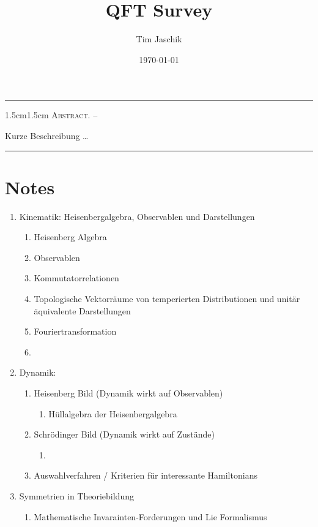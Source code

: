 \documentclass[10pt, letterpaper]{article}
\title{QFT Survey}
\author{Tim Jaschik}
\date{\today}
\renewenvironment{abstract}
  {
    \begin{adjustwidth}{1.5cm}{1.5cm}
    \small
    \textsc{Abstract. –}%
  }
  {
    \end{adjustwidth}
  }
\begin{document}
\maketitle
\rule{\textwidth}{0.5pt}
\begin{abstract}
Kurze Beschreibung …
\end{abstract}
\rule{\textwidth}{0.5pt}
\vspace{0.5cm}

\tableofcontents

\pagebreak

\section{Notes}


\begin{enumerate}
  \item Kinematik: Heisenbergalgebra, Observablen und Darstellungen
  \begin{enumerate}
    \item Heisenberg Algebra
    \item Observablen
    \item Kommutatorrelationen
    \item Topologische Vektorräume von temperierten Distributionen und unitär äquivalente Darstellungen
    \item Fouriertransformation
    \item 
  \end{enumerate} 
  \item Dynamik: 
  \begin{enumerate}
    \item Heisenberg Bild (Dynamik wirkt auf Observablen)
    \begin{enumerate}
      \item Hüllalgebra der Heisenbergalgebra  
    \end{enumerate}
    \item Schrödinger Bild (Dynamik wirkt auf Zustände)
    \begin{enumerate}
      \item 
    \end{enumerate}
    \item Auswahlverfahren / Kriterien für interessante Hamiltonians
  \end{enumerate}
  \item Symmetrien in Theoriebildung
  \begin{enumerate}
  \item Mathematische Invarainten-Forderungen und Lie Formalismus

\end{enumerate}
\end{enumerate}
\end{document}
